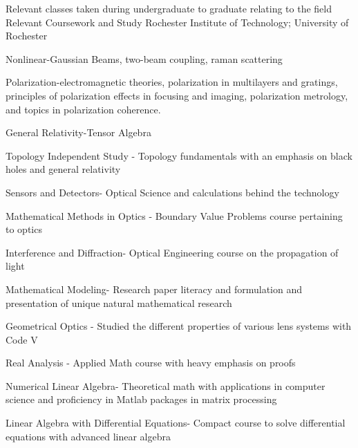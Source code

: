 \begin{cventries}
     \cventry
    {Relevant classes taken during undergraduate to graduate relating to the field}
    {Relevant Coursework and Study}
    {Rochester Institute of Technology; University of Rochester}
    {}
    {
      \begin{cvitems}
        \item{Nonlinear-Gaussian Beams, two-beam coupling, raman scattering}
        \item{Polarization-electromagnetic theories, polarization in multilayers and gratings, principles of polarization effects in focusing and imaging, polarization metrology, and topics in polarization coherence.}
        \item{General Relativity-Tensor Algebra}
        \item {Topology Independent Study - Topology fundamentals with an emphasis on black holes and general relativity}
        \item{Sensors and Detectors- Optical Science and calculations behind the technology}
        \item {Mathematical Methods in Optics - Boundary Value Problems course pertaining to optics}
        \item {Interference and Diffraction- Optical Engineering course on the propagation of light}
        \item {Mathematical Modeling- Research paper literacy and formulation and presentation of unique natural mathematical research}
        \item {Geometrical Optics - Studied the different properties of various lens systems with Code V}
        \item {Real Analysis - Applied Math course with heavy emphasis on proofs}
        \item {Numerical Linear Algebra- Theoretical math with applications in computer science and proficiency in Matlab packages in matrix processing}
        \item {Linear Algebra with Differential Equations- Compact course to solve differential equations with advanced linear algebra}
      \end{cvitems}
    }

   

\end{cventries}
